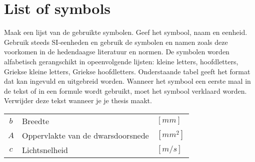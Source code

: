 \chapter*{List of symbols}

Maak een lijst van de gebruikte symbolen. Geef het symbool, naam en eenheid. Gebruik steeds SI-eenheden en gebruik de symbolen en namen zoals deze voorkomen in de hedendaagse literatuur en normen. De symbolen worden alfabetisch gerangschikt in opeenvolgende lijsten: kleine letters, hoofdletters, Griekse kleine letters, Griekse hoofdletters. Onderstaande tabel geeft het format dat kan ingevuld en uitgebreid worden. Wanneer het symbool een eerste maal in de tekst of in een formule wordt gebruikt, moet het symbool verklaard worden. Verwijder deze tekst wanneer je je thesis maakt.


\begin{table}[!h]
	\begin{tabular}{cll}
		$b$ & Breedte & $[mm]$\\
		$A$ & Oppervlakte van de dwarsdoorsnede & $[mm^2]$\\
		$c$ & Lichtsnelheid & $[m/s]$\\
	\end{tabular}
\end{table}


